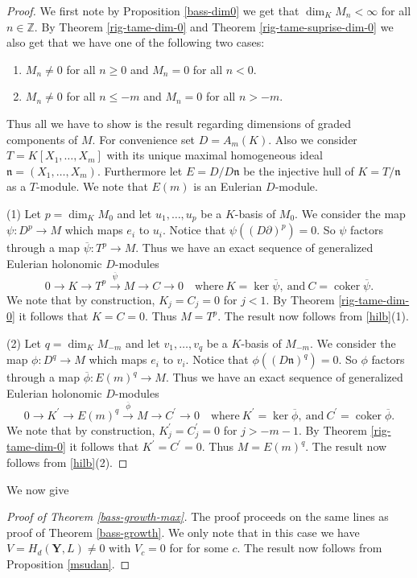 \documentclass{amsart}
\newcommand{\ZZ}{\mathbb{Z} }
\newcommand{\bY}{\mathbf{Y} }
\newcommand{\n}{\mathfrak{n} }
\newcommand{\rt}{\rightarrow}
\newcommand{\ov}{\overline}
\newcommand{\coker}{\operatorname{coker}}
\theoremstyle{plain}
\theoremstyle{definition}
\theoremstyle{remark}
\begin{document}
\begin{proof}
We first note by  Proposition \ref{bass-dim0} we get that $\dim_K M_n < \infty$ for all $n \in \ZZ$. By Theorem \ref{rig-tame-dim-0} and Theorem \ref{rig-tame-suprise-dim-0} we also get that we have one of the following two cases:
\begin{enumerate}[\rm (i)]
\item
$M_n \neq 0$ for all $n \geq 0$ and $M_n = 0$ for all $n < 0$.
\item
$M_n \neq 0$ for all $n \leq -m$ and $M_n = 0$ for all $n > -m$.
\end{enumerate}
Thus all we have to show is the result regarding dimensions of graded components of $M$. For convenience set $D = A_m(K)$. Also we consider $T = K[X_1,\ldots, X_m]$ with its unique maximal homogeneous  ideal $\n = (X_1,\ldots, X_m)$. Furthermore 
let $E = D/D\n$ be the injective hull of $K = T/\n$ as a $T$-module. We note that
$E(m)$ is an Eulerian $D$-module.

(1) Let $p = \dim_K M_0$ and let $u_1,\ldots, u_p$ be a $K$-basis of $M_0$. We consider the map $\psi \colon D^p \rt M$ which maps $e_i$ to $u_i$. Notice that
$\psi ((D\partial)^p) = 0$. So $\psi$ factors through a map $\ov{\psi} \colon T^p \rt M$. Thus we have an exact sequence of generalized Eulerian holonomic $D$-modules
\[
0 \rt K \rt T^p \xrightarrow{\ov{\psi}} M \rt C \rt 0 \quad \text{where} \ K = \ker \ov{\psi}, \ \text{and} \ C = \coker \ov{\psi}.
\]
We note that by construction, $K_j = C_j = 0$ for $j < 1$. By Theorem \ref{rig-tame-dim-0} it follows that $K = C = 0$. Thus $M = T^p$. The result now follows from \ref{hilb}(1).

(2) Let $q = \dim_K M_{-m}$ and let $v_1,\ldots, v_q$ be a $K$-basis of $M_{-m}$. We consider the map $\phi \colon D^q \rt M$ which maps $e_i$ to $v_i$. Notice that
$\phi ((D\n)^q) = 0$. So $\phi$ factors through a map $\ov{\phi} \colon E(m)^q \rt M$. Thus we have an exact sequence of generalized Eulerian holonomic $D$-modules
\[
0 \rt K^\prime \rt E(m)^q \xrightarrow{\ov{\phi}} M \rt C^\prime \rt 0 \quad \text{where} \ K^\prime = \ker \ov{\phi}, \ \text{and} \ C^\prime = \coker \ov{\phi}.
\]
We note that by construction, $K^\prime_j = C^\prime_j = 0$ for $j > -m - 1$. By Theorem \ref{rig-tame-dim-0} it follows that $K^\prime = C^\prime = 0$. Thus $M = E(m)^q$. The result now follows from \ref{hilb}(2).
\end{proof}

We now give
\begin{proof}[Proof of Theorem \ref{bass-growth-max}]
The proof proceeds on the same lines as proof of Theorem \ref{bass-growth}. We only note that in this case we have
$V = H_d(\bY, L) \neq 0$  with $V_c = 0$ for for some $c$. 
The result now follows from Proposition \ref{msudan}.
\end{proof}
\end{document}
